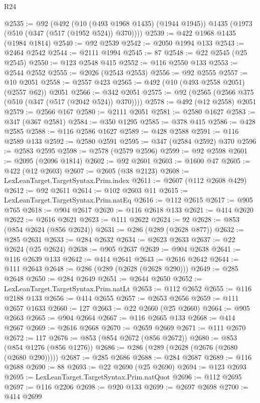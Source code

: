 \begin{lexlean}{R24}
\begin{coremodule}
@2535 := @92
    (@492
      (@10 (@493 @1968 @1435) (@1944 @1945))
      @1435
      (@1973 (@510 (@347 (@517 (@1952 @524)) @370))))
@2539 := @422 @1968 @1435 (@1984 @1814)
@2540 := @92 @2539
@2542 := @2050 @1994 @133
@2543 := @2464 @2542
@2544 := @2111 @1994
@2545 := 87
@2548 := @22 @2545 (@25 @2545)
@2550 := @123 @2548 @415
@2552 := @116 @2550 @133
@2553 := @2544 @2552
@2555 := @2026 (@2543 @2553)
@2556 := @92 @2555
@2557 := @10 @2051
@2558 := @2557 @423
@2565 := @492 (@10 (@493 @2558 @2051) (@2557 @62)) @2051
@2566 := @342 @2051
@2575 := @92 (@2565 (@2566 @375 (@510 (@347 (@517 (@2042 @524)) @370))))
@2578 := @492 (@12 @2558) @2051
@2579 := @2566 @167
@2580 := @2111 @2051
@2581 := @2580 @1627
@2583 := @347 (@367 @2581)
@2584 := @350 @1295
@2585 := @378 @415
@2586 := @428 @2585
@2588 := @116 @2586 @1627
@2589 := @428 @2588
@2591 := @116 @2589 @133
@2592 := @2580 @2591
@2595 := @347 (@2584 @2592) @370
@2596 := @2583 @2595
@2598 := @2578 (@2579 @2596)
@2599 := @92 @2598
@2601 := @2095 (@2096 @1814)
@2602 := @92 @2601
@2603 := @1600 @47
@2605 := @422 (@12 @2603)
@2607 := @2605 (@38 @2123)
@2608 := LexLeanTarget.TargetSyntax.Prim.index
@2611 := @2607 (@112 @2608 @429)
@2612 := @92 @2611
@2614 := @102 @2603 @11
@2615 := LexLeanTarget.TargetSyntax.Prim.natEq
@2616 := @112 @2615
@2617 := @905 @765
@2618 := @904 @2617
@2620 := @116 @2618 @133
@2621 := @414 @2620
@2622 := @2616 @2621
@2623 := @111 @2622
@2624 := 92
@2628 := @853 (@854 @2624 (@856 @2624))
@2631 := @286 (@289 (@2628 @877))
@2632 := @285 @2631
@2633 := @284 @2632
@2634 := @2623 @2633
@2637 := @22 @2624 (@25 @2624)
@2638 := @905 @2637
@2639 := @904 @2638
@2641 := @116 @2639 @133
@2642 := @414 @2641
@2643 := @2616 @2642
@2644 := @111 @2643
@2648 := @286 (@289 (@2628 (@2628 @290)))
@2649 := @285 @2648
@2650 := @284 @2649
@2651 := @2644 @2650
@2652 := LexLeanTarget.TargetSyntax.Prim.natLt
@2653 := @112 @2652
@2655 := @116 @2188 @133
@2656 := @414 @2655
@2657 := @2653 @2656
@2659 := @111 @2657 @1633
@2660 := 127
@2663 := @22 @2660 (@25 @2660)
@2664 := @905 @2663
@2665 := @904 @2664
@2667 := @116 @2665 @133
@2668 := @414 @2667
@2669 := @2616 @2668
@2670 := @2659 @2669
@2671 := @111 @2670
@2672 := 117
@2676 := @853 (@854 @2672 (@856 @2672))
@2680 := @853 (@854 @1276 (@856 @1276))
@2686 := @286 (@289 (@2628 (@2676 (@2680 (@2680 @290)))))
@2687 := @285 @2686
@2688 := @284 @2687
@2689 := @116 @2688
@2690 := 88
@2693 := @22 @2690 (@25 @2690)
@2694 := @123 @2693
@2695 := LexLeanTarget.TargetSyntax.Prim.natQuot
@2696 := @112 @2695
@2697 := @116 @2206
@2698 := @920 @133
@2699 := @2697 @2698
@2700 := @414 @2699

\end{coremodule}
\end{lexlean}
